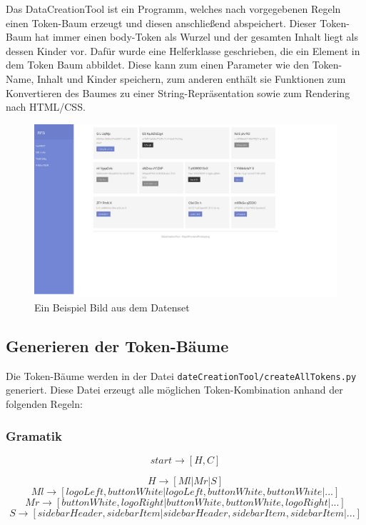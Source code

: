 \documentclass[pdftex,a4paper,halfparskip, article]{scrartcl}
\begin{document}
Das DataCreationTool ist ein Programm, welches nach vorgegebenen Regeln einen Token-Baum erzeugt und diesen anschließend abspeichert. Dieser Token-Baum hat immer einen body-Token als Wurzel und der gesamten Inhalt liegt als dessen Kinder vor. Dafür wurde eine Helferklasse geschrieben, die ein Element in dem Token Baum abbildet. Diese kann zum einen Parameter wie den Token-Name, Inhalt und Kinder speichern, zum anderen enthält sie Funktionen zum Konvertieren des Baumes zu einer String-Repräsentation sowie zum Rendering nach HTML/CSS. 

\begin{figure}[h]
\centering
\includegraphics[width=1\textwidth]{beispiel_daten}
\caption{Ein Beispiel Bild aus dem Datenset}
\label{fig:beispiel_daten}
\end{figure}

\subsection{Generieren der Token-Bäume}
Die Token-Bäume werden in der Datei \texttt{dateCreationTool/createAllTokens.py} generiert. Diese Datei erzeugt alle möglichen Token-Kombination anhand der folgenden Regeln:

\subsubsection{Gramatik}

\begin{equation}
start \rightarrow [H,C]
\end{equation}

\begin{equation}
H \rightarrow [Ml | Mr | S]
\end{equation}
\begin{equation}
Ml \rightarrow  [ logoLeft, buttonWhite | logoLeft, buttonWhite, buttonWhite | ...]
\end{equation}
\begin{equation}
Mr \rightarrow [buttonWhite, logoRight | buttonWhite, buttonWhite, logoRight | ...]
\end{equation}
\begin{equation}
S \rightarrow [sidebarHeader, sidebarItem| sidebarHeader, sidebarItem, sidebarItem | ...]
\end{equation}
\end{document}
